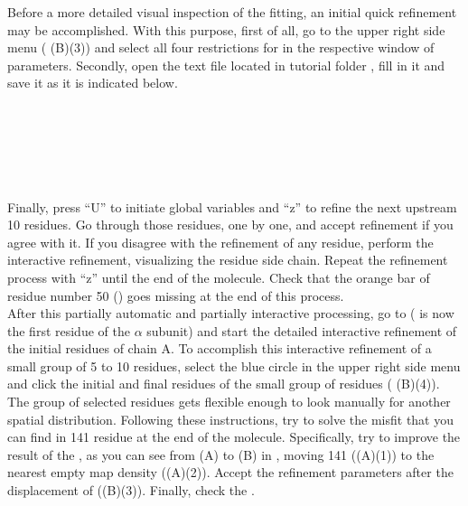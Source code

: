 \begin{itemize}
  Before a more detailed visual inspection of the  fitting, an initial quick refinement may be accomplished. With this purpose, first of all, go to the upper right side menu ( (B)(3)) and select all four restrictions for  in the respective window of parameters. Secondly, open the  text file located in \scipion tutorial folder , fill in it and save it as it is indicated below.\\
  
  \ttt{[myvars]}\\
  \\
  \\
  \\
  \\
  \\
 
 Finally, press ``U'' to initiate global variables and ``z'' to refine the next upstream 10 residues. Go through those residues, one by one, and accept refinement if you agree with it. If you disagree with the refinement of any residue, perform the interactive refinement, visualizing the residue side chain. Repeat the refinement process with ``z'' until the end of the molecule. Check that the orange bar of residue number 50 () goes missing at the end of this process.\\
 
 After this partially automatic and partially interactive processing, go to  ( is now the first residue of the  $\alpha$ subunit) and start the detailed interactive refinement of the initial residues of chain A. To accomplish this interactive refinement of a small group of 5 to 10 residues, select the blue circle in the upper right side menu and click the initial and final residues of the small group of residues ( (B)(4)). The group of selected residues gets flexible enough to look manually for another spatial distribution. Following these instructions, try to solve the misfit that you can find in  141 residue at the end of the molecule. Specifically, try to improve the result of the , as you can see from (A) to (B) in , moving  141 ((A)(1)) to the nearest empty map density ((A)(2)). Accept the refinement parameters after the displacement of  ((B)(3)). Finally, check the .
 

\end{itemize}
